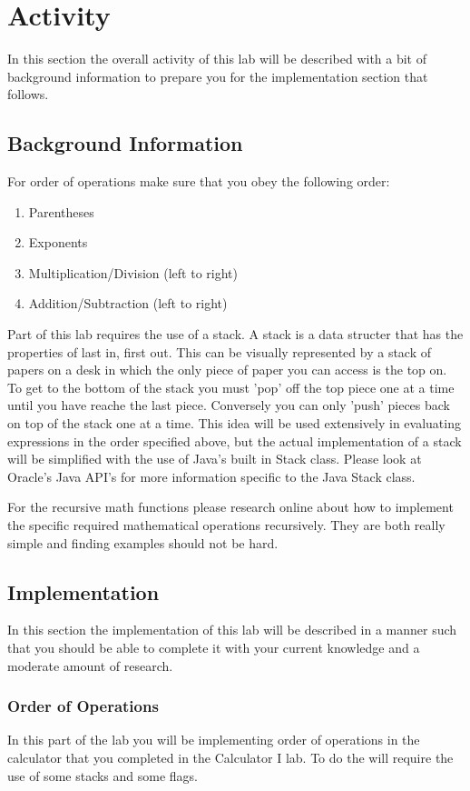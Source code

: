\section{Activity}
In this section the overall activity of this lab will be described with a bit of background information to prepare you for the implementation section that follows.
\subsection{Background Information}
For order of operations make sure that you obey the following order:
\begin{enumerate}
\item Parentheses
\item Exponents
\item Multiplication/Division (left to right)
\item Addition/Subtraction (left to right)
\end{enumerate}

Part of this lab requires the use of a stack.  A stack is a data structer that has the properties of last in, first out.  This can be visually represented by a stack of papers on a desk in which the only piece of paper you can access is the top on.  To get to the bottom of the stack you must 'pop' off the top piece one at a time until you have reache the last piece.  Conversely you can only 'push' pieces back on top of the stack one at a time.  This idea will be used extensively in evaluating expressions in the order specified above, but the actual implementation of a stack will be simplified with the use of Java's built in Stack class.  Please look at Oracle's Java API's for more information specific to the Java Stack class.

For the recursive math functions please research online about how to implement the specific required mathematical operations recursively.  They are both really simple and finding examples should not be hard.

\subsection{Implementation}
In this section the implementation of this lab will be described in a manner such that you should be able to complete it with your current knowledge and a moderate amount of research.
\subsubsection{Order of Operations}
In this part of the lab you will be implementing order of operations in the calculator that you completed in the Calculator I lab.  To do the will require the use of some stacks and some flags.  

